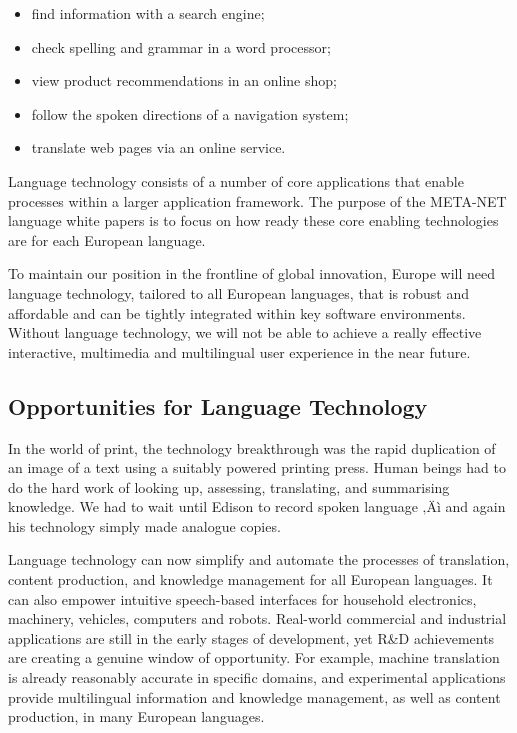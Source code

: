 \begin{multicols}{2}
\begin{itemize}
\item find information with a search engine;
\item check spelling and grammar in a word processor;
\item view product recommendations in an online shop;
\item follow the spoken directions of a navigation system;
\item translate web pages via an online service.
\end{itemize}

Language technology consists of a number of core applications that enable processes within a larger application framework. The purpose of the META-NET language white papers is to focus on how ready these core enabling technologies are for each European language. 


To maintain our position in the frontline of global innovation, Europe will need language technology, tailored to all European languages, that is robust and affordable and can be tightly integrated within key software environments. Without language technology, we will not be able to achieve a really effective interactive, multimedia and multilingual user experience in the near future.


\subsection{Opportunities for Language Technology}

In the world of print, the technology breakthrough was the rapid duplication of an image of a text using a suitably powered printing press. Human beings had to do the hard work of looking up, assessing, translating, and summarising knowledge. We had to wait until Edison to record spoken language ‚Äì and again his technology simply made analogue copies.

Language technology can now simplify and automate the processes of translation, content production, and knowledge management for all European languages. It can also empower intuitive speech-based interfaces for household electronics, machinery, vehicles, computers and robots. Real-world commercial and industrial applications are still in the early stages of development, yet R\&D achievements are creating a genuine window of opportunity. For example, machine translation is already reasonably accurate in specific domains, and experimental applications provide multilingual information and knowledge management, as well as content production, in many European languages. 


\end{multicols}
